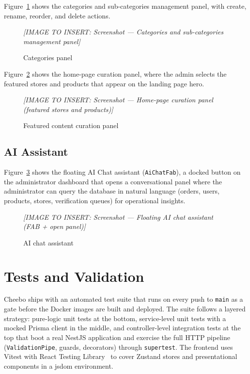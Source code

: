 \documentclass[12pt, a4paper, oneside]{report}
\newcommand{\imagePlaceholder}[2][8cm]{%
  \begin{mdframed}[backgroundcolor=cheebolightgray,linecolor=gray!40]
    \centering
    \vspace{#1}
    \textit{\color{gray}[IMAGE TO INSERT: #2]}
    \vspace{8mm}
  \end{mdframed}
}
\begin{document}
Figure~\ref{fig:categories-panel} shows the categories and
sub-categories management panel, with create, rename, reorder, and
delete actions.

\begin{figure}[H]
  \centering
  \imagePlaceholder[8cm]{Screenshot — Categories and sub-categories management panel}
  \caption{Categories panel}
  \label{fig:categories-panel}
\end{figure}

Figure~\ref{fig:home-curate} shows the home-page curation panel,
where the admin selects the featured stores and products that appear
on the landing page hero.

\begin{figure}[H]
  \centering
  \imagePlaceholder[8cm]{Screenshot — Home-page curation panel (featured stores and products)}
  \caption{Featured content curation panel}
  \label{fig:home-curate}
\end{figure}

\subsection{AI Assistant}

Figure~\ref{fig:ai-chat} shows the floating AI Chat assistant
(\texttt{AiChatFab}), a docked button on the administrator dashboard
that opens a conversational panel where the administrator can query
the database in natural language (orders, users, products, stores,
verification queues) for operational insights.

\begin{figure}[H]
  \centering
  \imagePlaceholder[8cm]{Screenshot — Floating AI chat assistant (FAB + open panel)}
  \caption{AI chat assistant}
  \label{fig:ai-chat}
\end{figure}

\section{Tests and Validation}
\label{sec:tests}

Cheebo ships with an automated test suite that runs on every push to
\texttt{main} as a gate before the Docker images are built and
deployed. The suite follows a layered strategy: pure-logic unit tests
at the bottom, service-level unit tests with a mocked Prisma client in
the middle, and controller-level integration tests at the top that
boot a real NestJS application and exercise the full HTTP pipeline
(\texttt{ValidationPipe}, guards, decorators) through
\texttt{supertest}. The frontend uses Vitest with React Testing
Library~\cite{rtl} to cover Zustand stores and presentational components in a
jsdom environment.
\end{document}
